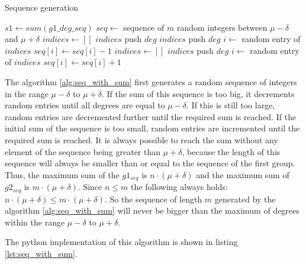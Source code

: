\begin{algorithm}
\caption{Sequence generation}
\label{alg:seq_with_sum}
\begin{algorithmic}
\State $s1 \gets sum(g1\_deg\_seq)$
\State $seq \gets $ sequence of $m$ random integers between $\mu - \delta$ and $\mu + \delta$
        \State $indices \gets []$
                \State $indices$ push $deg$
            \EndIf
        \EndFor
                \State $indices$ push $deg$
            \EndIf
            \EndFor
        \EndIf
        \State $i \gets $ random entry of $indices$
        \State $seq[i] \gets seq[i] - 1$
    \Else
        \State $indices \gets []$
                \State $indices$ push $deg$
            \EndIf
        \EndFor
        \State $i \gets $ random entry of $indices$
        \State $seq[i] \gets seq[i] + 1$
    \EndIf
\EndWhile
\end{algorithmic}
\end{algorithm}

The algorithm \ref{alg:seq_with_sum} first generates a random sequence of integers in the range $\mu - \delta$ to $\mu + \delta$. If the sum of this sequence is too big, it decrements random entries until all degrees are equal to $\mu - \delta$. If this is still too large, random entries are decremented further until the required sum is reached. If the initial sum of the sequence is too small, random entries are incremented until the required sum is reached. It is always possible to reach the sum without any element of the sequence being greater than $\mu + \delta$, because the length of this sequence will always be smaller than or equal to the sequence of the first group. Thus, the maximum sum of the $g1_{seq}$ is $n \cdot (\mu + \delta)$ and the maximum sum of $g2_{seq}$ is $m \cdot (\mu + \delta)$. Since $n \leq m$ the following always holds: $n \cdot (\mu + \delta) \leq m \cdot (\mu + \delta)$. So the sequence of length $m$ generated by the algorithm \ref{alg:seq_with_sum} will never be bigger than the maximum of degrees within the range $\mu - \delta$ to $\mu + \delta$.

The python implementation of this algorithm is shown in listing \ref{lst:seq_with_sum}.

